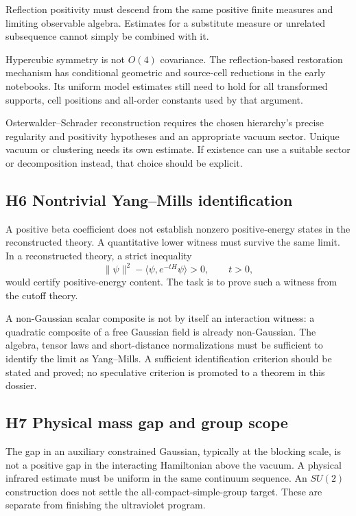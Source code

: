 \documentclass[11pt]{article}
\theoremstyle{remark}
\begin{document}
Reflection positivity must descend from the same
positive finite measures and limiting observable
algebra. Estimates for a substitute measure or
unrelated subsequence cannot simply be combined
with it.

Hypercubic symmetry is not \(O(4)\) covariance.
The reflection-based restoration mechanism has
conditional geometric and source-cell reductions
in the early notebooks. Its uniform model
estimates still need to hold for all transformed
supports, cell positions and all-order constants
used by that argument.

Osterwalder--Schrader reconstruction requires the
chosen hierarchy's precise regularity and
positivity hypotheses and an appropriate vacuum
sector. Unique vacuum or clustering needs its
own estimate. If existence can use a suitable
sector or decomposition instead, that choice
should be explicit.

\subsection{H6 Nontrivial Yang--Mills identification}

A positive beta coefficient does not establish
nonzero positive-energy states in the reconstructed
theory. A quantitative lower witness must survive
the same limit. In a reconstructed theory, a
strict inequality
\[
 \|\psi\|^2-\langle\psi,e^{-tH}\psi\rangle>0,\qquad t>0,
\]
would certify positive-energy content. The task is
to prove such a witness from the cutoff theory.

A non-Gaussian scalar composite is not by itself
an interaction witness: a quadratic composite of
a free Gaussian field is already non-Gaussian.
The algebra, tensor laws and short-distance
normalizations must be sufficient to identify
the limit as Yang--Mills. A sufficient
identification criterion should be stated and
proved; no speculative criterion is promoted to
a theorem in this dossier.

\subsection{H7 Physical mass gap and group scope}

The gap in an auxiliary constrained Gaussian,
typically at the blocking scale, is not a
positive gap in the interacting Hamiltonian
above the vacuum. A physical infrared estimate
must be uniform in the same continuum sequence.
An \(SU(2)\) construction does not settle the
all-compact-simple-group target. These are
separate from finishing the ultraviolet program.
\end{document}
